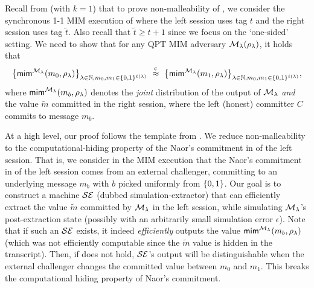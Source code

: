 Recall from  (with $k =1$) that to prove non-malleability of , we consider the synchronous 1-1 MIM execution of  where the left session uses tag $t$ and the right session uses tag $\tilde{t}$. Also recall that $\tilde{t} \ge t+1$ since we focus on the `one-sided' setting. We need to show that for any QPT MIM adversary $\mathcal{M}_\lambda(\rho_\lambda)$, it holds that
\begin{equation}\label{thm:pqnmc:eq:target}
\big\{\mathsf{mim}^{\mathcal{M}_\lambda}(m_0, \rho_\lambda)\big\}_{\lambda \in \mathbb{N}, m_0, m_1 \in \{0,1\}^{\ell(\lambda)}} ~\stackrel{\text{c}}{\approx}~ \big\{\mathsf{mim}^{\mathcal{M}_\lambda}( m_1, \rho_\lambda)\big\}_{\lambda \in \mathbb{N}, m_0, m_1 \in \{0,1\}^{\ell(\lambda)}},
\end{equation}
where $\mathsf{mim}^{\mathcal{M}_\lambda}(m_b, \rho_\lambda)$ denotes the {\em joint} distribution of the output of $\mathcal{M}_\lambda$ {\em and} the value $\tilde{m}$ committed in the right session, where the left (honest) committer $C$ commits to message $m_b$.

At a high level, our proof follows the template from \cite{FOCS:LPY23}. We reduce non-malleability to the computational-hiding property of the Naor's commitment in  of the left session. That is, we consider in the MIM execution that the Naor's commitment in  of the left session comes from an external challenger, committing to an underlying message $m_b$ with $b$ picked uniformly from $\{0,1\}$. Our goal is to construct a machine $\mathcal{SE}$ (dubbed simulation-extractor) that can efficiently extract the value $\tilde{m}$ committed by $\mathcal{M}_\lambda$ in the left session, while simulating $\mathcal{M}_\lambda$'s post-extraction state (possibly with an arbitrarily small simulation error $\epsilon$). Note that if such an $\mathcal{SE}$ exists, it indeed {\em efficiently} outputs the value $\mathsf{mim}^{\mathcal{M}_\lambda}(m_b, \rho_\lambda)$ (which was not efficiently computable since the $\tilde{m}$ value is hidden in the transcript). Then, if  does not hold, $\mathcal{SE}$'s output will be distinguishable when the external challenger changes the committed value between $m_0$ and $m_1$. This breaks the computational hiding property of Naor's commitment.

